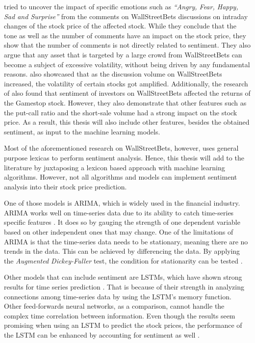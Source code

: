 \documentclass[11pt, a4paper]{article}
\begin{document}
\cite{long2021LikeTheStock} tried to uncover the impact of specific emotions such as \emph{“Angry, Fear, Happy, Sad and Surprise”} from the comments on 
WallStreetBets discussions on intraday changes of the stock price of the affected stock. While they conclude that the tone as well as the number of 
comments have an impact on the stock price, they show that the number of comments is not directly related to sentiment.
They also argue that any asset that is targeted by a large crowd from WallStreetBets can become a subject 
of excessive volatility, without being driven by any fundamental reasons.
\cite{lyocsa2021yolotrading} also showcased that as the discussion volume on WallStreetBets increased, the volatility of certain stocks got amplified. 
Additionally, the research of \cite{umar2021ataleofcompanyfundamentals} also found that sentiment of investors on WallStreetBets affected the returns of the Gamestop stock. 
However, they also demonstrate that other features such as the put-call ratio and the short-sale volume had a strong impact on the stock price. As a result, this thesis
will also include other features, besides the obtained sentiment, as input to the machine learning models.

Most of the aforementioned research on WallStreetBets, however, uses general purpose lexicas to perform sentiment analysis. Hence, this thesis will add to the literature 
by juxtaposing a lexicon based approach with machine learning algorithms.
However, not all algorithms and models can implement sentiment analysis into their stock price prediction.

One of those models is ARIMA, which is widely used in the financial industry. ARIMA works well on time-series data due to its
ability to catch time-series specific features \citep{vuong2021forecasting}. It does so by gauging the strength of one dependent variable based on other independent
ones that may change. One of the limitations of ARIMA is that the time-series data needs to be stationary, meaning there are no trends in the data.
This can be achieved by differencing the data.
By applying the \emph{Augmented Dickey-Fuller} test, the condition for stationarity can be tested \citep{ivanovic2013arima}.

Other models that can include sentiment are LSTMs, which have shown strong results for time series prediction \citep{rammurthy2021lstm}. That is because of their strength in 
analyzing connections among time-series data by using the LSTM's memory function. Other feed-forwards neural networks, as a comparison, cannot handle the complex 
time correlation between information. Even though the results seem promising when using an LSTM to predict the stock prices, the performance of the LSTM 
can be enhanced by accounting for sentiment as well \citep{jin2020lstmsentiment, wang2019forecasting}.
\end{document}
